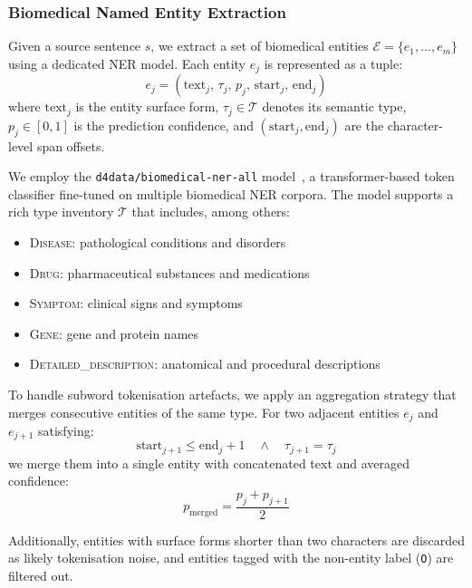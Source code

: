 \subsubsection{Biomedical Named Entity Extraction}

Given a source sentence $s$, we extract a set of biomedical entities $\mathcal{E} = \{e_1, \ldots, e_m\}$ using a dedicated NER model. Each entity $e_j$ is represented as a tuple:
\begin{equation}
    e_j = (\text{text}_j, \, \tau_j, \, p_j, \, \text{start}_j, \, \text{end}_j)
\end{equation}
where $\text{text}_j$ is the entity surface form, $\tau_j \in \mathcal{T}$ denotes its semantic type, $p_j \in [0, 1]$ is the prediction confidence, and $(\text{start}_j, \text{end}_j)$ are the character-level span offsets.

We employ the \texttt{d4data/biomedical-ner-all} model~\cite{d4data2022}, a transformer-based token classifier fine-tuned on multiple biomedical NER corpora. The model supports a rich type inventory $\mathcal{T}$ that includes, among others:
\begin{itemize}
    \item \textsc{Disease}: pathological conditions and disorders
    \item \textsc{Drug}: pharmaceutical substances and medications
    \item \textsc{Symptom}: clinical signs and symptoms
    \item \textsc{Gene}: gene and protein names
    \item \textsc{Detailed\_description}: anatomical and procedural descriptions
\end{itemize}

To handle subword tokenisation artefacts, we apply an aggregation strategy that merges consecutive entities of the same type. For two adjacent entities $e_j$ and $e_{j+1}$ satisfying:
\begin{equation}
    \text{start}_{j+1} \leq \text{end}_j + 1 \quad \land \quad \tau_{j+1} = \tau_j
\end{equation}
we merge them into a single entity with concatenated text and averaged confidence:
\begin{equation}
    p_{\text{merged}} = \frac{p_j + p_{j+1}}{2}
\end{equation}

Additionally, entities with surface forms shorter than two characters are discarded as likely tokenisation noise, and entities tagged with the non-entity label (\texttt{O}) are filtered out.

